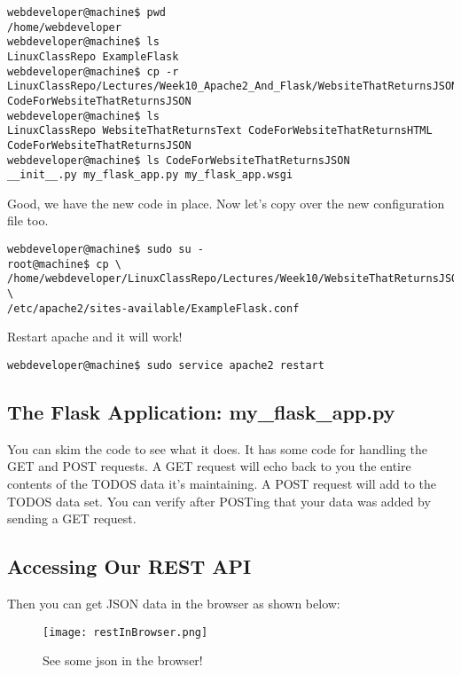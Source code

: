 \documentclass[10pt]{article}
\begin{document}
\begin{lstlisting}[style=term, caption=Deploying our third website]
webdeveloper@machine$ pwd
/home/webdeveloper
webdeveloper@machine$ ls
LinuxClassRepo ExampleFlask
webdeveloper@machine$ cp -r
LinuxClassRepo/Lectures/Week10_Apache2_And_Flask/WebsiteThatReturnsJSON/WebsiteThatReturnsJSON
CodeForWebsiteThatReturnsJSON
webdeveloper@machine$ ls
LinuxClassRepo WebsiteThatReturnsText CodeForWebsiteThatReturnsHTML CodeForWebsiteThatReturnsJSON
webdeveloper@machine$ ls CodeForWebsiteThatReturnsJSON
__init__.py my_flask_app.py my_flask_app.wsgi
\end{lstlisting}

Good, we have the new code in place. Now let's copy over the new configuration
file too.

\begin{lstlisting}[style=term, caption=Get the configuration file for example 3]
webdeveloper@machine$ sudo su -
root@machine$ cp \
/home/webdeveloper/LinuxClassRepo/Lectures/Week10/WebsiteThatReturnsJSON/ExampleFlask.conf \
/etc/apache2/sites-available/ExampleFlask.conf
\end{lstlisting}


Restart apache and it will work!

\begin{lstlisting}[style=term, caption=Restart the apache2 service.]
webdeveloper@machine$ sudo service apache2 restart
\end{lstlisting}


\subsection{The Flask Application: my\_flask\_app.py}
You can skim the code to see what it does. It has some code for handling the GET and POST requests. A GET request will echo back to you the entire contents of the TODOS data it's maintaining. A POST request will add to the TODOS data set. You can verify after POSTing that your data was added by sending a GET request.



\subsection{Accessing Our REST API}
Then you can get JSON data in the browser as shown below:

\begin{figure}[h]
  \centering
    \texttt{[image: restInBrowser.png]}
  \caption{See some json in the browser!}
\end{figure}
\end{document}
